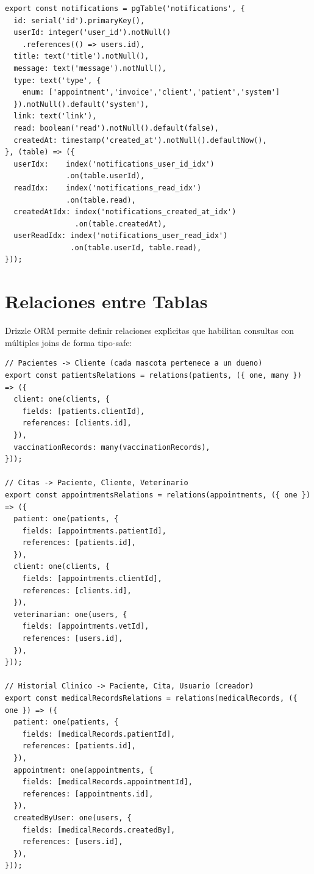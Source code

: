 \begin{lstlisting}[style=typescript, caption=Esquema notifications]
export const notifications = pgTable('notifications', {
  id: serial('id').primaryKey(),
  userId: integer('user_id').notNull()
    .references(() => users.id),
  title: text('title').notNull(),
  message: text('message').notNull(),
  type: text('type', {
    enum: ['appointment','invoice','client','patient','system']
  }).notNull().default('system'),
  link: text('link'),
  read: boolean('read').notNull().default(false),
  createdAt: timestamp('created_at').notNull().defaultNow(),
}, (table) => ({
  userIdx:    index('notifications_user_id_idx')
              .on(table.userId),
  readIdx:    index('notifications_read_idx')
              .on(table.read),
  createdAtIdx: index('notifications_created_at_idx')
                .on(table.createdAt),
  userReadIdx: index('notifications_user_read_idx')
               .on(table.userId, table.read),
}));
\end{lstlisting}

\section{Relaciones entre Tablas}

Drizzle ORM permite definir relaciones expl\'{\i}citas que habilitan
consultas con m\'ultiples joins de forma tipo-safe:

\begin{lstlisting}[style=typescript, caption=Relaciones definidas con drizzle-orm/relations]
// Pacientes -> Cliente (cada mascota pertenece a un dueno)
export const patientsRelations = relations(patients, ({ one, many }) => ({
  client: one(clients, {
    fields: [patients.clientId],
    references: [clients.id],
  }),
  vaccinationRecords: many(vaccinationRecords),
}));

// Citas -> Paciente, Cliente, Veterinario
export const appointmentsRelations = relations(appointments, ({ one }) => ({
  patient: one(patients, {
    fields: [appointments.patientId],
    references: [patients.id],
  }),
  client: one(clients, {
    fields: [appointments.clientId],
    references: [clients.id],
  }),
  veterinarian: one(users, {
    fields: [appointments.vetId],
    references: [users.id],
  }),
}));

// Historial Clinico -> Paciente, Cita, Usuario (creador)
export const medicalRecordsRelations = relations(medicalRecords, ({ one }) => ({
  patient: one(patients, {
    fields: [medicalRecords.patientId],
    references: [patients.id],
  }),
  appointment: one(appointments, {
    fields: [medicalRecords.appointmentId],
    references: [appointments.id],
  }),
  createdByUser: one(users, {
    fields: [medicalRecords.createdBy],
    references: [users.id],
  }),
}));
\end{lstlisting}

